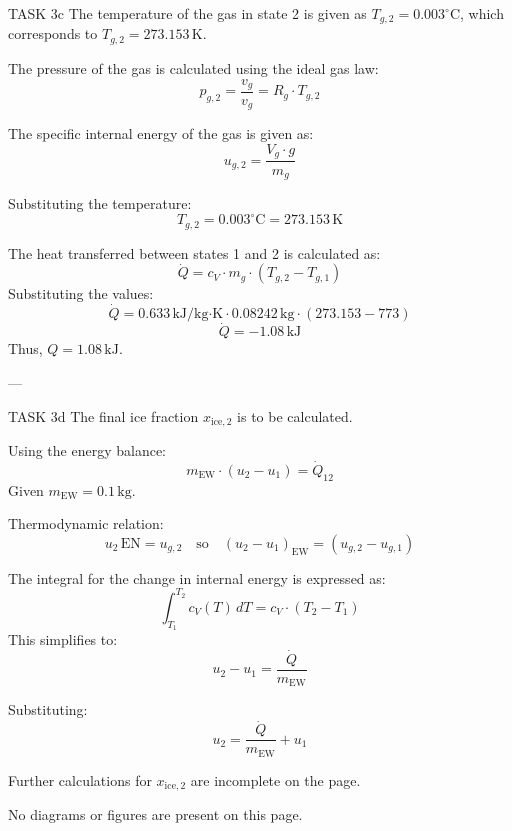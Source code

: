 TASK 3c  
The temperature of the gas in state 2 is given as \( T_{g,2} = 0.003^\circ\text{C} \), which corresponds to \( T_{g,2} = 273.153 \, \text{K} \).  

The pressure of the gas is calculated using the ideal gas law:  
\[
p_{g,2} = \frac{v_{g}}{v_{g}} = R_g \cdot T_{g,2}
\]  

The specific internal energy of the gas is given as:  
\[
u_{g,2} = \frac{V_{g} \cdot g}{m_g}
\]  

Substituting the temperature:  
\[
T_{g,2} = 0.003^\circ\text{C} = 273.153 \, \text{K}
\]  

The heat transferred between states 1 and 2 is calculated as:  
\[
\dot{Q} = c_V \cdot m_g \cdot (T_{g,2} - T_{g,1})
\]  
Substituting the values:  
\[
\dot{Q} = 0.633 \, \text{kJ/kg·K} \cdot 0.08242 \, \text{kg} \cdot (273.153 - 773)
\]  
\[
\dot{Q} = -1.08 \, \text{kJ}
\]  
Thus, \( Q = 1.08 \, \text{kJ} \).  

---

TASK 3d  
The final ice fraction \( x_{\text{ice},2} \) is to be calculated.  

Using the energy balance:  
\[
m_{\text{EW}} \cdot (u_2 - u_1) = \dot{Q}_{12}
\]  
Given \( m_{\text{EW}} = 0.1 \, \text{kg} \).  

Thermodynamic relation:  
\[
u_2 \, \text{EN} = u_{g,2} \quad \text{so} \quad (u_2 - u_1)_{\text{EW}} = (u_{g,2} - u_{g,1})
\]  

The integral for the change in internal energy is expressed as:  
\[
\int_{T_1}^{T_2} c_V(T) \, dT = c_V \cdot (T_2 - T_1)
\]  
This simplifies to:  
\[
u_2 - u_1 = \frac{\dot{Q}}{m_{\text{EW}}}
\]  

Substituting:  
\[
u_2 = \frac{\dot{Q}}{m_{\text{EW}}} + u_1
\]  

Further calculations for \( x_{\text{ice},2} \) are incomplete on the page.  

No diagrams or figures are present on this page.
